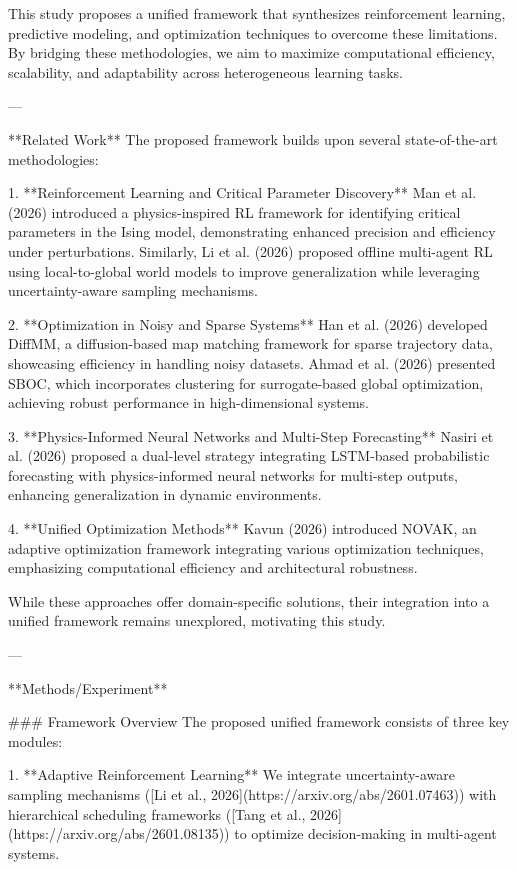 This study proposes a unified framework that synthesizes reinforcement learning, predictive modeling, and optimization techniques to overcome these limitations. By bridging these methodologies, we aim to maximize computational efficiency, scalability, and adaptability across heterogeneous learning tasks.

---

**Related Work**  
The proposed framework builds upon several state-of-the-art methodologies:  

1. **Reinforcement Learning and Critical Parameter Discovery**  
Man et al. (2026) introduced a physics-inspired RL framework for identifying critical parameters in the Ising model, demonstrating enhanced precision and efficiency under perturbations. Similarly, Li et al. (2026) proposed offline multi-agent RL using local-to-global world models to improve generalization while leveraging uncertainty-aware sampling mechanisms.

2. **Optimization in Noisy and Sparse Systems**  
Han et al. (2026) developed DiffMM, a diffusion-based map matching framework for sparse trajectory data, showcasing efficiency in handling noisy datasets. Ahmad et al. (2026) presented SBOC, which incorporates clustering for surrogate-based global optimization, achieving robust performance in high-dimensional systems.

3. **Physics-Informed Neural Networks and Multi-Step Forecasting**  
Nasiri et al. (2026) proposed a dual-level strategy integrating LSTM-based probabilistic forecasting with physics-informed neural networks for multi-step outputs, enhancing generalization in dynamic environments.

4. **Unified Optimization Methods**  
Kavun (2026) introduced NOVAK, an adaptive optimization framework integrating various optimization techniques, emphasizing computational efficiency and architectural robustness.

While these approaches offer domain-specific solutions, their integration into a unified framework remains unexplored, motivating this study.

---

**Methods/Experiment**  

### Framework Overview  
The proposed unified framework consists of three key modules:  

1. **Adaptive Reinforcement Learning**  
We integrate uncertainty-aware sampling mechanisms ([Li et al., 2026](https://arxiv.org/abs/2601.07463)) with hierarchical scheduling frameworks ([Tang et al., 2026](https://arxiv.org/abs/2601.08135)) to optimize decision-making in multi-agent systems.  

